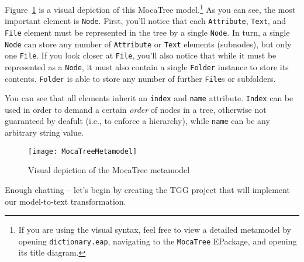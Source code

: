 Figure~\ref{mocaTreeMetamodel} is a visual depiction of this MocaTree model.\footnote{If you are using the visual syntax, feel free to view a detailed metamodel
by opening \texttt{dictionary.eap}, navigating to the \texttt{MocaTree} EPackage, and opening its title diagram.} As you can see, the most important
element is \texttt{Node}. First, you'll notice that each \texttt{Attribute}, \texttt{Text}, and \texttt{File} element must be represented in the tree by a single
\texttt{Node}. In turn, a single \texttt{Node} can store any number of \texttt{Attribute} or \texttt{Text} elements (subnodes), but only one \texttt{File}. If
you look closer at \texttt{File}, you'll also notice that while it must be represented as a \texttt{Node}, it must also contain a single \texttt{Folder}
instance to store its contents. \texttt{Folder} is able to store any number of further \texttt{File}s or subfolders.

\newpage

You can see that all elements inherit an \texttt{index} and \texttt{name} attribute. \texttt{Index} can be used in order to demand a certain \emph{order}
of nodes in a tree, otherwise not guaranteed by deafult (i.e., to enforce a hierarchy), while \texttt{name} can be any arbitrary string value. 

\vspace{1cm}

\begin{figure}[htbp]
  \hspace{-3cm}
  \texttt{[image: MocaTreeMetamodel]}
  \caption{Visual depiction of the MocaTree metamodel}
  \label{mocaTreeMetamodel}
\end{figure}

\vspace{1cm}

Enough chatting -- let's begin by creating the TGG project that will implement our model-to-text transformation.


\newpage







